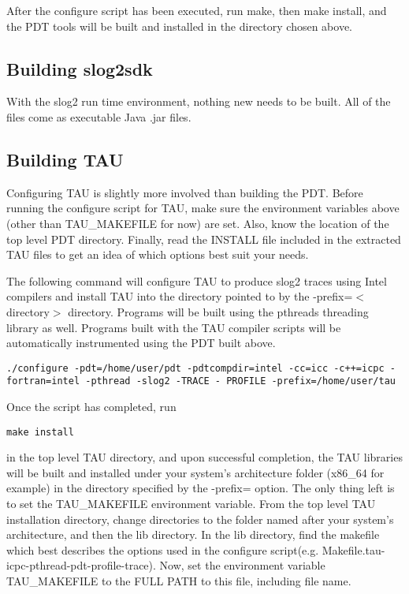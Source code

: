 \documentclass[11pt,letterpaper]{article}
\begin{document}
After the configure script has been executed, run make, then make install, and the PDT tools will be built and installed in the directory chosen above.

\subsection{Building slog2sdk}
With the slog2 run time environment, nothing new needs to be built. All of the files come as executable Java .jar files.

\subsection{Building TAU}
Configuring TAU is slightly more involved than building the PDT. Before running the configure script for TAU, make sure the environment variables above (other than TAU\_MAKEFILE for now) are set. Also, know the location of the top level PDT directory. Finally, read the INSTALL file included in the extracted TAU files to get an idea of which options best suit your needs.

The following command will configure TAU to produce slog2 traces using Intel compilers and install TAU into the directory pointed to by the -prefix=$<$directory$>$ directory. Programs will be built using the pthreads threading library as well. Programs built with the TAU compiler scripts will be automatically instrumented using the PDT built above.
\begin{cmd_line}
\texttt{./configure -pdt=/home/user/pdt -pdtcompdir=intel -cc=icc -c++=icpc
        -fortran=intel -pthread -slog2 -TRACE - PROFILE -prefix=/home/user/tau}
\end{cmd_line}

Once the script has completed, run
\begin{cmd_line}
\texttt{make install}
\end{cmd_line}
in the top level TAU directory, and upon successful completion, the TAU libraries will be built and installed under your system's architecture folder (x86\_64 for example) in the directory specified by the -prefix= option. The only thing left is to set the TAU\_MAKEFILE environment variable. From the top level TAU installation directory, change directories to the folder named after your system's architecture, and then the lib directory. In the lib directory, find the makefile which best describes the options used in the configure script(e.g. Makefile.tau-icpc-pthread-pdt-profile-trace). Now, set the environment variable TAU\_MAKEFILE to the FULL PATH to this file, including file name.
\end{document}
